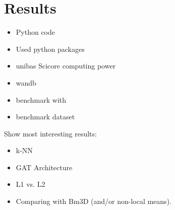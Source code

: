 \chapter{Results}
\label{sec:results}





\begin{itemize}
  \item Python code
  \item Used python packages
  \item unibas Scicore computing power
  \item wandb\cite{wandb}
  \item benchmark with \cite{bm3d}
  \item benchmark dataset \cite{lodopab-dataset}
\end{itemize}


Show most interesting results:
\begin{itemize}
  \item k-NN
  \item GAT Architecture
  \item L1 vs. L2
  \item Comparing with Bm3D (and/or non-local means).
\end{itemize}
